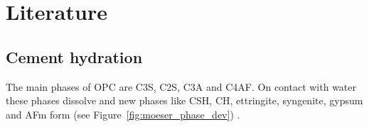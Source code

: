 \chapter{Literature}


\section{Cement hydration}


The main phases of \ac{OPC} are \ac{C3S}, \ac{C2S}, \ac{C3A} and \ac{C4AF}.
On contact with water these phases dissolve and new phases like \ac{CSH}, \ac{CH}, ettringite, syngenite, gypsum and \ac{AFm} form (see Figure~\ref{fig:moeser_phase_dev}) \cite{moser.2001, stark.2003}.

